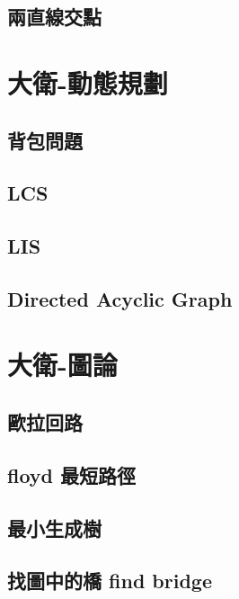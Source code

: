 \subsection{兩直線交點}
\raggedbottom
\hrulefill

\section{大衛-動態規劃}
\subsection{背包問題}
\raggedbottom
\hrulefill
\subsection{LCS}
\raggedbottom
\hrulefill
\subsection{LIS}
\raggedbottom
\hrulefill
\subsection{Directed Acyclic Graph}
\raggedbottom
\hrulefill

\section{大衛-圖論}
\subsection{歐拉回路}
\raggedbottom
\hrulefill
\subsection{floyd 最短路徑}
\raggedbottom
\hrulefill
\subsection{最小生成樹}
\raggedbottom
\hrulefill
\subsection{找圖中的橋 find bridge}
\raggedbottom
\hrulefill
